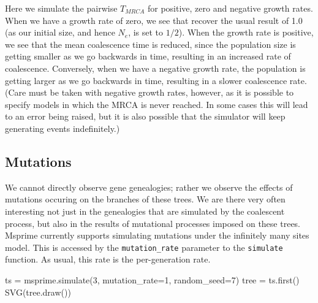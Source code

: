 \documentclass[graybox]{svmult}
\begin{document}
    Here we simulate the pairwise \(T_{MRCA}\) for positive, zero and
negative growth rates. When we have a growth rate of zero, we see that
recover the usual result of 1.0 (as our initial size, and hence \(N_e\),
is set to \(1/2\)). When the growth rate is positive, we see that the
mean coalescence time is reduced, since the population size is getting
smaller as we go backwards in time, resulting in an increased rate of
coalescence. Conversely, when we have a negative growth rate, the
population is getting larger as we go backwards in time, resulting in a
slower coalescence rate. (Care must be taken with negative growth rates,
however, as it is possible to specify models in which the MRCA is never
reached. In some cases this will lead to an error being raised, but it
is also possible that the simulator will keep generating events
indefinitely.)

    \subsection{Mutations}\label{mutations}

We cannot directly observe gene genealogies; rather we observe the
effects of mutations occuring on the branches of these trees. We are
there very often interesting not just in the genealogies that are
simulated by the coalescent process, but also in the results of
mutational processes imposed on these trees. Msprime currently supports
simulating mutations under the infinitely many sites model. This is
accessed by the \texttt{mutation\_rate} parameter to the
\texttt{simulate} function. As usual, this rate is the per-generation
rate.

\begin{pythoncode}
ts = msprime.simulate(3, mutation_rate=1, random_seed=7)
tree = ts.first()
SVG(tree.draw())
\end{pythoncode}
\end{document}
